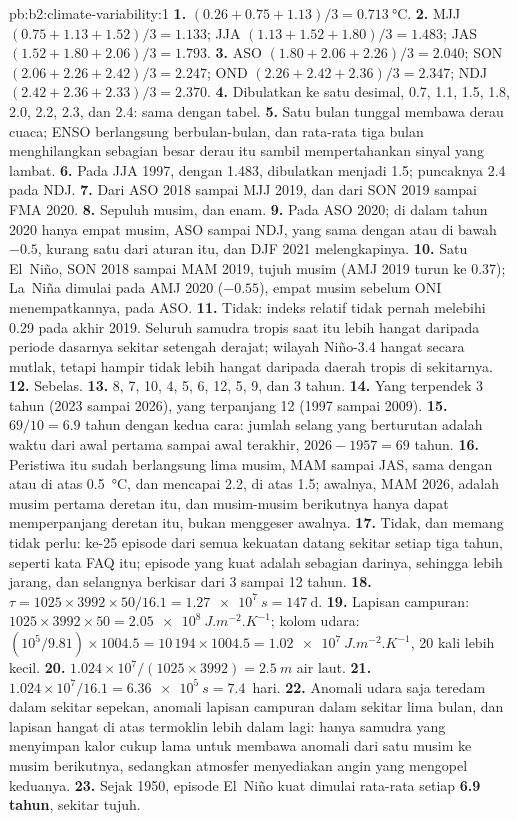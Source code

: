 \begin{solution}{pb:b2:climate-variability:1}
\textbf{1.} $(0.26 + 0.75 + 1.13)/3 = \qty{0.713}{\celsius}$.
\textbf{2.} MJJ $(0.75 + 1.13 + 1.52)/3 = 1.133$; JJA $(1.13 + 1.52 + 1.80)/3 = 1.483$; JAS $(1.52 +
1.80 + 2.06)/3 = 1.793$.
\textbf{3.} ASO $(1.80 + 2.06 + 2.26)/3 = 2.040$; SON $(2.06 + 2.26 + 2.42)/3 = 2.247$; OND $(2.26
+ 2.42 + 2.36)/3 = 2.347$; NDJ $(2.42 + 2.36 + 2.33)/3 = 2.370$.
\textbf{4.} Dibulatkan ke satu desimal, 0.7, 1.1, 1.5, 1.8, 2.0, 2.2, 2.3, dan 2.4: sama dengan tabel.
\textbf{5.} Satu bulan tunggal membawa derau cuaca; ENSO berlangsung berbulan-bulan, dan rata-rata tiga bulan
menghilangkan sebagian besar derau itu sambil mempertahankan sinyal yang lambat.
\textbf{6.} Pada JJA 1997, dengan 1.483, dibulatkan menjadi 1.5; puncaknya 2.4 pada NDJ.
\textbf{7.} Dari ASO 2018 sampai MJJ 2019, dan dari SON 2019 sampai FMA 2020.
\textbf{8.} Sepuluh musim, dan enam.
\textbf{9.} Pada ASO 2020; di dalam tahun 2020 hanya empat musim, ASO sampai NDJ, yang sama dengan atau di bawah $-0.5$, kurang
satu dari aturan itu, dan DJF 2021 melengkapinya.
\textbf{10.} Satu El~Niño, SON 2018 sampai MAM 2019, tujuh musim (AMJ 2019 turun ke 0.37); La~Niña
dimulai pada AMJ 2020 ($-0.55$), empat musim sebelum ONI menempatkannya, pada ASO.
\textbf{11.} Tidak: indeks relatif tidak pernah melebihi 0.29 pada akhir 2019. Seluruh samudra tropis
saat itu lebih hangat daripada periode dasarnya sekitar setengah derajat; wilayah Niño-3.4 hangat secara
mutlak, tetapi hampir tidak lebih hangat daripada daerah tropis di sekitarnya.
\textbf{12.} Sebelas.
\textbf{13.} 8, 7, 10, 4, 5, 6, 12, 5, 9, dan 3 tahun.
\textbf{14.} Yang terpendek 3 tahun (2023 sampai 2026), yang terpanjang 12 (1997 sampai 2009).
\textbf{15.} $69/10 = 6.9$ tahun dengan kedua cara: jumlah selang yang berturutan adalah waktu dari
awal pertama sampai awal terakhir, $2026 - 1957 = 69$ tahun.
\textbf{16.} Peristiwa itu sudah berlangsung lima musim, MAM sampai JAS, sama dengan atau di atas \qty{0.5}{\celsius}, dan
mencapai 2.2, di atas 1.5; awalnya, MAM 2026, adalah musim pertama deretan itu, dan musim-musim berikutnya
hanya dapat memperpanjang deretan itu, bukan menggeser awalnya.
\textbf{17.} Tidak, dan memang tidak perlu: ke-25 episode dari semua kekuatan datang sekitar setiap tiga tahun, seperti kata FAQ itu;
episode yang kuat adalah sebagian darinya, sehingga lebih jarang, dan selangnya berkisar dari 3 sampai 12 tahun.
\textbf{18.} $\tau = 1025 \times 3992 \times 50/16.1 = \qty{1.27e7}{s} = \qty{147}{\day}$.
\textbf{19.} Lapisan campuran: $1025 \times 3992 \times 50 = \qty{2.05e8}{J.m^{-2}.K^{-1}}$; kolom udara:
$(10^5/9.81) \times 1004.5 = 10\,194 \times 1004.5 = \qty{1.02e7}{J.m^{-2}.K^{-1}}$, 20 kali
lebih kecil.
\textbf{20.} $1.024 \times 10^7/(1025 \times 3992) = \qty{2.5}{m}$ air laut.
\textbf{21.} $1.024 \times 10^7/16.1 = \qty{6.36e5}{s} = 7.4$~hari.
\textbf{22.} Anomali udara saja teredam dalam sekitar sepekan, anomali lapisan campuran dalam
sekitar lima bulan, dan lapisan hangat di atas termoklin lebih dalam lagi: hanya samudra yang menyimpan
kalor cukup lama untuk membawa anomali dari satu musim ke musim berikutnya, sedangkan atmosfer menyediakan
angin yang mengopel keduanya.
\textbf{23.} Sejak 1950, episode El~Niño kuat dimulai rata-rata setiap \textbf{6.9 tahun},
sekitar tujuh.
\end{solution}
